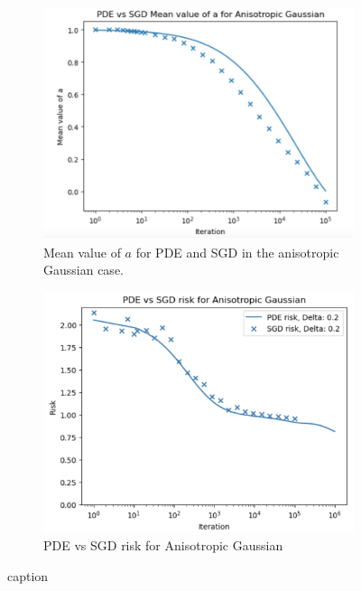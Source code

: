 \documentclass{article}
\begin{document}
     \begin{figure}[H]
 \begin{subfigure}{0.5\textwidth}
   \centering
   \includegraphics[width=0.8\linewidth]{images/NGuyen2018-pde-sgd-gauss-anisotropic.png}
   \caption{Mean value of $ a$ for PDE and SGD in the anisotropic Gaussian case.}
   \label{fig: val a anisotropic}
 \end{subfigure}%
 \begin{subfigure}{0.5\textwidth}
   \centering
   \includegraphics[width=0.8\linewidth]{images/NGuyen2018-pde-sgd-risk-gauss-anisotropic.png}
   \caption{PDE vs SGD risk for Anisotropic Gaussian}
   \label{fig: risk anisotropic}
 \end{subfigure}
 \caption{ caption}
 \label{fig: anisotropic gaussian case plots}
 \end{figure} 
\end{document}
